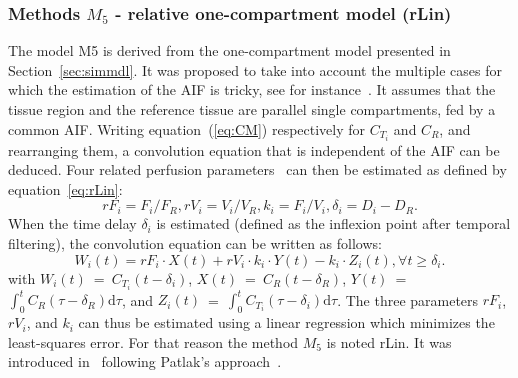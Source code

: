 \subsubsection{Methods $M_5$ - relative one-compartment model (rLin)}
The model M5 is derived from the one-compartment model presented in Section~\ref{sec:simmdl}. It was proposed to take into account the multiple cases for which the estimation of the AIF is tricky, see for instance~\cite{Doury:2017fz}.
It assumes that the tissue region and the reference tissue are parallel single compartments, fed by a common AIF. 
Writing equation~(\ref{eq:CM}) respectively for $C_{T_i}$ and $C_R$, and rearranging them, a convolution equation that is independent of the AIF can be deduced. Four related perfusion parameters~\cite{Doury:2017fz} can then be estimated as defined by equation~\ref{eq:rLin}:
\begin{equation}
rF_i = F_i/F_R, rV_i = V_i/V_R, k_i = F_i/V_i, \delta_i = D_i - D_R.
\label{eq:rLin}
\end{equation}
When the time delay $\delta_i$ is estimated (defined as the inflexion point after temporal filtering), the convolution equation can be written as follows:
\begin{equation}
W_i(t)= rF_i \cdot X(t) + rV_i \cdot k_i \cdot Y(t) - k_i \cdot Z_i(t), \forall t \geq \delta_i.
\label{eq:rLin2}
\end{equation} 
 with $W_i(t)$~=~$C_{T_i}(t-\delta_i)$, $X(t)$~=~$C_R(t-\delta_R)$, $Y(t)$~=~$\int_0^t C_R \left(\tau-\delta_R\right)\mathrm d\tau$,
and $Z_i(t)$~=~$\int_0^t C_{T_i} \left(\tau-\delta_i \right)\mathrm d\tau$.
The three parameters $rF_i$, $rV_i$, and $k_i$ can thus be estimated using a linear regression which minimizes the least-squares error. For that reason the method $M_5$ is noted rLin. It was introduced in~\cite{Doury:2016fi} following Patlak's approach~\cite{Patlak:1983id}.

